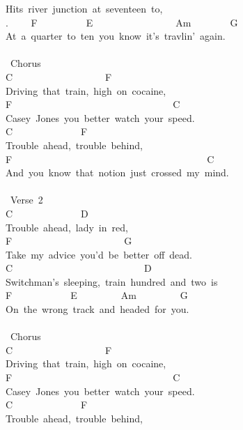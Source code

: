 {Hits\ river\ junction\ at\ seventeen\ to,\\
. \ \ \ \ F\ \ \ \ \ \ \ \ \ \ E\ \ \ \ \ \ \ \ \ \ \ \ \ \ \ \ \ Am\ \ \ \ \ \ \ \ G\\
At\ a\ quarter\ to\ ten\ you\ know\ it's\ travlin'\ again.\\
\\
\lbrack\ Chorus\rbrack\\
C\ \ \ \ \ \ \ \ \ \ \ \ \ \ \ \ \ \ \ F\\
Driving\ that\ train,\ high\ on\ cocaine,\\
F\ \ \ \ \ \ \ \ \ \ \ \ \ \ \ \ \ \ \ \ \ \ \ \ \ \ \ \ \ \ \ \ \ C\\
Casey\ Jones\ you\ better\ watch\ your\ speed.\\
C\ \ \ \ \ \ \ \ \ \ \ \ \ \ F\\
Trouble\ ahead,\ trouble\ behind,\\
F\ \ \ \ \ \ \ \ \ \ \ \ \ \ \ \ \ \ \ \ \ \ \ \ \ \ \ \ \ \ \ \ \ \ \ \ \ \ \ \ C\\
And\ you\ know\ that\ notion\ just\ crossed\ my\ mind.\\
\\
\lbrack\ Verse\ 2\rbrack\\
C\ \ \ \ \ \ \ \ \ \ \ \ \ \ D\\
Trouble\ ahead,\ lady\ in\ red,\\
F\ \ \ \ \ \ \ \ \ \ \ \ \ \ \ \ \ \ \ \ \ \ \ G\\
Take\ my\ advice\ you'd\ be\ better\ off\ dead.\\
C\ \ \ \ \ \ \ \ \ \ \ \ \ \ \ \ \ \ \ \ \ \ \ \ \ \ \ D\\
Switchman's\ sleeping,\ train\ hundred\ and\ two\ is\\
F\ \ \ \ \ \ \ \ \ \ \ \ E\ \ \ \ \ \ \ \ \ Am\ \ \ \ \ \ \ \ \ G\\
On\ the\ wrong\ track\ and\ headed\ for\ you.\\
\\
\lbrack\ Chorus\rbrack\\
C\ \ \ \ \ \ \ \ \ \ \ \ \ \ \ \ \ \ \ F\\
Driving\ that\ train,\ high\ on\ cocaine,\\
F\ \ \ \ \ \ \ \ \ \ \ \ \ \ \ \ \ \ \ \ \ \ \ \ \ \ \ \ \ \ \ \ \ C\\
Casey\ Jones\ you\ better\ watch\ your\ speed.\\
C\ \ \ \ \ \ \ \ \ \ \ \ \ \ F\\
Trouble\ ahead,\ trouble\ behind,\\
}
